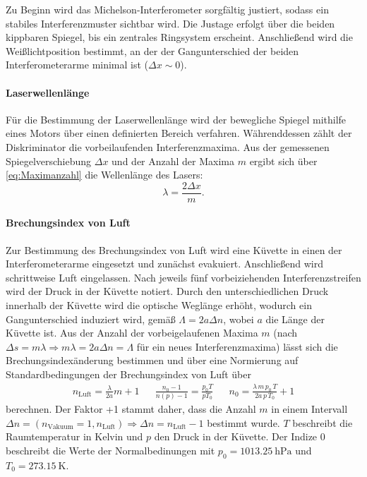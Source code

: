 Zu Beginn wird das Michelson-Interferometer sorgfältig justiert, sodass ein stabiles Interferenzmuster sichtbar wird. Die Justage erfolgt über die beiden kippbaren Spiegel, bis ein zentrales Ringsystem erscheint. Anschließend wird die Weißlichtposition bestimmt, an der der Gangunterschied der beiden Interferometerarme minimal ist (\(\Delta x\sim0\)).  

\paragraph{Laserwellenlänge}
Für die Bestimmung der Laserwellenlänge wird der bewegliche Spiegel mithilfe eines Motors über einen definierten Bereich verfahren. Währenddessen zählt der Diskriminator die vorbeilaufenden Interferenzmaxima. Aus der gemessenen Spiegelverschiebung \(\Delta x\) und der Anzahl der Maxima \(m\) ergibt sich über \cref{eq:Maximanzahl} die Wellenlänge des Lasers:
\begin{equation}
    \lambda = \frac{2 \Delta x}{m}.
    \label{eq:laserWellenlange}
\end{equation}

\paragraph{Brechungsindex von Luft}
Zur Bestimmung des Brechungsindex von Luft wird eine Küvette in einen der Interferometerarme eingesetzt und zunächst evakuiert. Anschließend wird schrittweise Luft eingelassen. Nach jeweils fünf vorbeiziehenden Interferenzstreifen wird der Druck in der Küvette notiert. Durch den unterschiedlichen Druck innerhalb der Küvette wird die optische Weglänge erhöht, wodurch ein Gangunterschied induziert wird, gemäß \(\Lambda = 2a\Delta n\),
wobei \(a\) die Länge der Küvette ist. Aus der Anzahl der vorbeigelaufenen Maxima \(m\) (nach \(\Delta s=m\lambda \Rightarrow m\lambda = 2 a \Delta n= \Lambda\) für ein neues Interferenzmaxima) lässt sich die Brechungsindexänderung bestimmen und über eine Normierung auf Standardbedingungen der Brechungsindex von Luft über 
\begin{align}
    n_\text{Luft}=\frac{\lambda}{2a}m+1&&\frac{n_0-1}{n(p)-1}=\frac{p_0T}{pT_0}&&n_0 = \frac{\lambda \, m \, p_0 \, T}{2a \, p \, T_0} + 1
    \label{eq:brechungsindexnormalbedinungen}
\end{align}
berechnen. Der Faktor +1 stammt daher, dass die Anzahl \(m\) in einem Intervall \(\Delta n=(n_\text{Vakuum}=1,n_\text{Luft})\Rightarrow \Delta n=n_\text{Luft}-1\) bestimmt wurde. \(T\) beschreibt die Raumtemperatur in Kelvin und \(p\) den Druck in der Küvette. Der Indize \(0\) beschreibt die Werte der Normalbedinungen mit \(p_0 = \qty{1013.25}{\hecto\pascal}\) und \(T_0 = \qty{273.15}{\kelvin}\).



